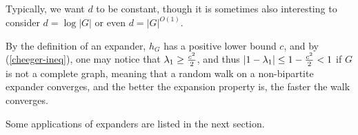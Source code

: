 Typically, we want $d$ to be constant, though it is sometimes also
interesting to consider $d=\log{|G|}$ or even $d=|G|^{O(1)}$.

By the definition of an expander, $h_G$ has a positive lower bound
$c$, and by (\ref{cheeger-ineq}), one may notice that $\lambda_1\ge
{c^2\over 2}$, and thus $|1-\lambda_1|\le 1-{c^2\over 2}<1$ if $G$
is not a complete graph, meaning that a random walk on a
non-bipartite expander converges, and the better the expansion
property is, the faster the walk converges.

Some applications of expanders are listed in the next section.
